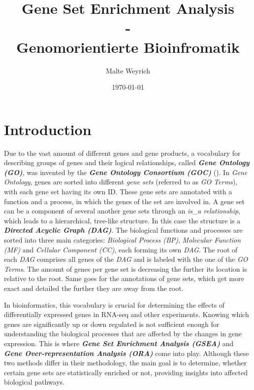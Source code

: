 \documentclass[12pt]{article}
\title{Gene Set Enrichment Analysis \\-\\ Genomorientierte Bioinfromatik}
\author{Malte Weyrich}
\date{\today}
\begin{document}
\maketitle
\begin{abstract}


\end{abstract}

\newpage



\section{Introduction}\label{sec:Introduction}
Due to the vast amount of different genes and gene products, a vocabulary for describing
groups of genes and their logical relationships, called \textit{\textbf{Gene Ontology
(GO)}}, was invented by the \textit{\textbf{Gene Ontology Consortium (GOC)}} (\cite{Ashburner2000}).
In \textit{Gene Ontology}, genes are sorted into different \textit{gene sets} (referred
to as \textit{GO Terms}), with each gene set having its own ID.
These gene sets are annotated with a function and a process,
in which the genes of the set are involved in. A gene set can be a component of several
another gene sets through an \textit{is\_a relationship}, which leads to a hierarchical,
tree-like structure. In this case the structure is a \textit{\textbf{Directed Acyclic
Graph (DAG)}}. The biological functions and processes are sorted into three main categories:
\textit{Biological Process (BP)}, \textit{Molecular Function (MF)} and \textit{Cellular
Component (CC)}, each forming its own \textit{DAG}. The root of each \textit{DAG}
comprises all genes of the \textit{DAG} and is labeled with the one of the \textit{GO
Terms}. The amount of genes per gene set is decreasing the further its location is
relative to the root. Same goes for the annotations of gene sets, which get more exact
and detailed the further they are away from the root. 

In bioinformatics, this vocabulary is crucial for determining the effects of differentially
expressed genes in RNA-seq and other experiments. Knowing which genes are significantly
up or down regulated is not sufficient enough for understanding the biological processes
that are affected by the changes in gene expression. This is where \textit{\textbf{Gene
Set Enrichment Analysis (GSEA)}} and \textit{\textbf{Gene Over-representation Analysis
(ORA)}} come into play. Although these two methods differ in their methodology, the
main goal is to determine, whether certain gene sets are statistically enriched or
not, providing insights into affected biological pathways.
\end{document}
